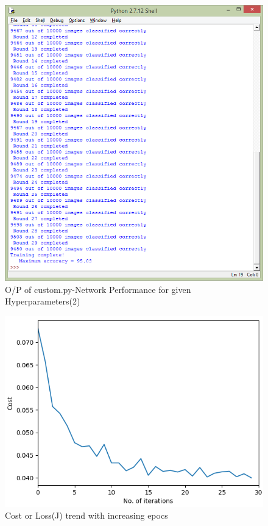\documentclass[conference]{IEEEtran}
\begin{document}
\begin{figure}[h]
	\centering
	\includegraphics[width=\linewidth]{custom2}
	\caption{O/P of custom.py-Network Performance for given Hyperparameters(2)}
\end{figure}
\begin{figure}[h]
	\centering
	\includegraphics[width=\linewidth]{Custom_cost}
	\caption{Cost or Loss(J) trend with increasing epocs}
\end{figure}
\end{document}
